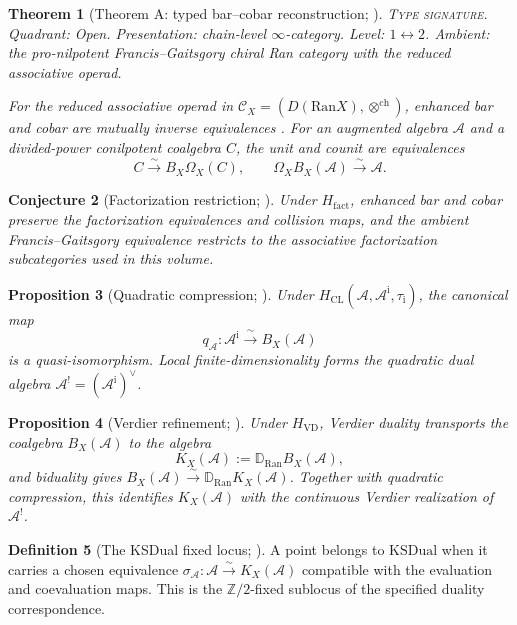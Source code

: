 \documentclass[11pt]{article}
\theoremstyle{plain}
\newtheorem{theorem}{Theorem}[section]
\newtheorem{proposition}[theorem]{Proposition}
\newtheorem{conjecture}[theorem]{Conjecture}
\theoremstyle{definition}
\newtheorem{definition}[theorem]{Definition}
\theoremstyle{remark}
\newcommand{\Ran}{\mathrm{Ran}}
\newcommand{\cA}{\mathcal{A}}
\begin{document}
\begin{theorem}[Theorem A: typed bar--cobar reconstruction;
\ClaimStatusProvedElsewhere]
\label{thm:bar-cobar-adjunction}
\textsc{Type signature.} Quadrant: Open. Presentation: chain-level
$\infty$-category. Level: $1\leftrightarrow2$.  Ambient:
the pro-nilpotent Francis--Gaitsgory chiral Ran category with the
reduced associative operad.

For the reduced associative operad in
$\mathcal C_X=(D(\Ran X),\otimes^{\mathrm{ch}})$, enhanced bar and
cobar are mutually inverse equivalences
\cite[Proposition~4.1.2, together with the pro-nilpotence argument in
the proof of Theorem~5.1.1]{FG12}.
For an augmented algebra $\cA$ and a divided-power conilpotent
coalgebra $C$, the unit and counit are equivalences
\[
 C\xrightarrow{\ \sim\ }B_X\Omega_X(C),
 \qquad
 \Omega_XB_X(\cA)\xrightarrow{\ \sim\ }\cA.
\]
\end{theorem}

\begin{conjecture}[Factorization restriction; \ClaimStatusConjectured]
\label{conj:standalone-factorization-restriction}
Under $H_{\mathrm{fact}}$, enhanced bar and cobar preserve the
factorization equivalences and collision maps, and the ambient
Francis--Gaitsgory equivalence restricts to the associative
factorization subcategories used in this volume.
\end{conjecture}

\begin{proposition}[Quadratic compression; \ClaimStatusConditional]
\label{prop:standalone-quadratic-compression}
Under $H_{\mathrm{CL}}(\cA,\cA^{\mathrm i},\tau_{\mathrm i})$, the canonical map
\[
 q_\cA\colon\cA^{\mathrm i}\xrightarrow{\ \sim\ }B_X(\cA)
\]
is a quasi-isomorphism.  Local finite-dimensionality forms the
quadratic dual algebra $\cA^!=(\cA^{\mathrm i})^\vee$.
\end{proposition}

\begin{proposition}[Verdier refinement; \ClaimStatusConditional]
\label{prop:standalone-verdier-refinement}
Under $H_{\mathrm{VD}}$, Verdier duality transports the coalgebra
$B_X(\cA)$ to the algebra
\[
 K_X(\cA):=\mathbb D_{\Ran}B_X(\cA),
\]
and biduality gives
$B_X(\cA)\xrightarrow{\sim}\mathbb D_{\Ran}K_X(\cA)$.
Together with quadratic compression, this identifies $K_X(\cA)$
with the continuous Verdier realization of $\cA^!$.
\end{proposition}

\begin{definition}[The KSDual fixed locus; \ClaimStatusDefinitional]
\label{def:standalone-ksdual-fixed-locus}
A point belongs to $\mathrm{KSDual}$ when it carries a chosen
equivalence $\sigma_\cA\colon\cA\xrightarrow{\sim}K_X(\cA)$
compatible with the evaluation and coevaluation maps.  This is the
$\mathbb Z/2$-fixed sublocus of the specified duality correspondence.
\end{definition}
\end{document}
